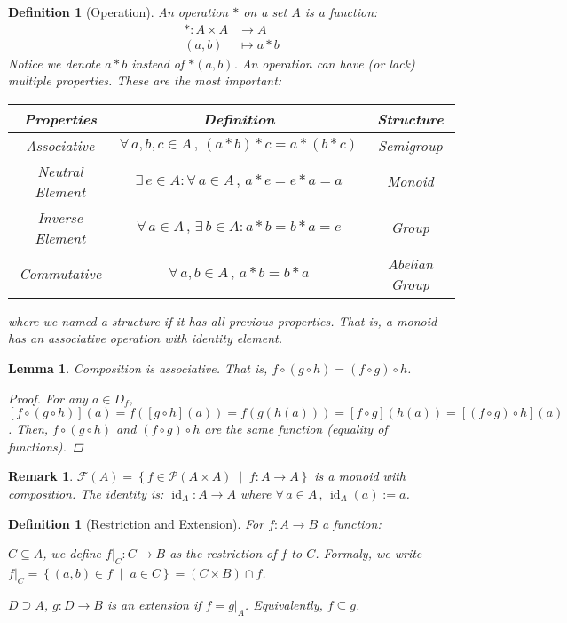 \documentclass[12pt]{article}
\renewcommand{\arraystretch}{0.8}
\newcommand{\set}[2]{\left\{{#1}\;\middle|\;{#2}\right\}}
\newcommand{\Forall}[1]{\forall\,{#1}\,,\,}
\newcommand{\Exist}[1]{\exists\,{#1}:}
\DeclareMathOperator{\id}{id}
\newtheorem{definition}[theorem]{Definition}
\newtheorem{lemma}[theorem]{Lemma}
\newtheorem{remark}[theorem]{Remark}
\begin{document}
\begin{definition}[Operation]
  An operation $*$ on a set $A$ is a function: $$
  \begin{aligned}
    *: A\times A&\to A\\
    (a,b)&\mapsto a*b
  \end{aligned}$$
  Notice we denote $a*b$ instead of $*(a,b)$. An operation can have (or lack) multiple properties. These are the most important:
  \begin{table}[H]
    \centering
    \renewcommand{\arraystretch}{1.5}
    \begin{tabular}{|c|c|c|}\hline
      Properties & Definition & Structure \\\hline
      Associative & $\Forall{a,b,c\in A} (a*b)*c=a*(b*c)$ & Semigroup\\\hline
      Neutral Element & $\Exist{e\in A}\Forall{a\in A}a*e=e*a=a$ & Monoid\\\hline
      Inverse Element & $\Forall{a\in A}\Exist{b\in A} a*b=b*a=e$ & Group\\\hline
      Commutative & $\Forall{a,b\in A} a*b=b*a$ & Abelian Group\\\hline
    \end{tabular}
  \end{table} 
  \noindent where we named a structure if it has all previous properties. That is, a monoid has an associative operation with identity element.
\end{definition}

\begin{lemma}
  Composition is associative. That is, $f\circ(g\circ h)=(f\circ g)\circ h$.
  \begin{proof} For any $a\in D_f$, $[f\circ(g\circ h)](a)=f([g\circ h](a))=f(g(h(a)))=[f\circ g](h(a))=[(f\circ g)\circ h](a)$. Then, $f\circ(g\circ h)$ and $(f\circ g)\circ h$ are the same function (equality of functions).
  \end{proof}
\end{lemma}

\begin{remark}
  $\mathcal{F}(A)=\set{f\in \mathcal{P}(A\times A)}{f:A\to A}$ is a monoid with composition. The identity is: $\id_A:A\to A$ where $\Forall{a\in A}\id_A(a):=a$.
\end{remark}

\begin{definition}[Restriction and Extension]
  For $f:A\to B$ a function:
  \begin{compactenum}[(a)]
    \item $C\subseteq A$, we define $f|_{C}:C\to B$ as the restriction of $f$ to $C$. Formaly, we write $f|_{C}=\set{(a,b)\in f}{a\in C}=(C\times B)\cap f$. 
    \item $D\supseteq A$, $g:D\to B$ is an extension if $f=g|_A$. Equivalently, $f\subseteq g$.
  \end{compactenum}
\end{definition}
\end{document}
